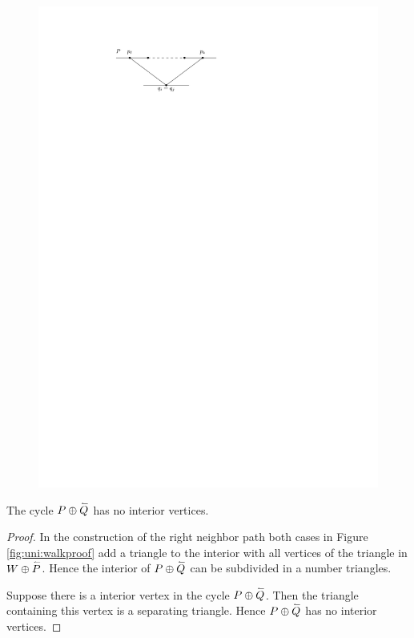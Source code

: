   \begin{figure}[h]
    \centering
    \includegraphics[scale=1]{unifiedAlgo/img/rightNeighbourwalk/neighborPathisPath.pdf}
    \caption{}
    \label{fig:right:path}
  \end{figure}

  \begin{lemma}
    \label{lm:uni:neighbourwalkNoInteriorVertex}
    The cycle $P \oplus \accentset{\leftharpoonup}{Q}$ has no interior vertices.
  \end{lemma}
  \begin{proof}
    In the construction of the right neighbor path both cases in Figure \ref{fig:uni:walkproof} add a triangle to the interior with all vertices of the triangle in $W \oplus \accentset{\leftharpoonup}{P}$. Hence the interior of $P \oplus \accentset{\leftharpoonup}{Q}$ can be subdivided in a number triangles.

    Suppose there is a interior vertex in the cycle $P \oplus \accentset{\leftharpoonup}{Q}$. Then the triangle containing this vertex is a separating triangle. Hence $P \oplus \accentset{\leftharpoonup}{Q}$ has no interior vertices.
  \end{proof}


